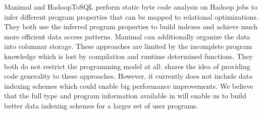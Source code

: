 Manimal and HadoopToSQL perform static byte code analysis on Hadoop jobs to infer different program properties that can be mapped to relational optimizations. They both use the inferred program properties to build indexes and achieve much more efficient data access patterns. Manimal can additionally organize the data into columnar storage. These approaches are limited by the incomplete program knowledge which is lost by compilation and runtime determined functions. They both do not restrict the programming model at all. 
\tool shares the idea of providing code generality to these approaches. However, it currently does not include data indexing schemes which could enable big performance improvements. We believe that the full type and program information available in \tool will enable us to build better data indexing schemes for a larger set of user programs.
